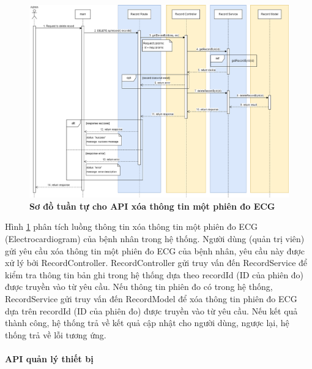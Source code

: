  \begin{figure}[H]
  \centering
  \includegraphics[scale=0.4]{Images/sequence_api/deleteRecordById.png}
  \caption[Sơ đồ tuần tự cho API xóa thông tin một phiên đo ECG ]{\bfseries \fontsize{12pt}{0pt}
  \selectfont Sơ đồ tuần tự cho API xóa thông tin một phiên đo ECG }
  \label{api_deleteRecordById} %
\end{figure}
Hình \ref{api_deleteRecordById} phân tích luồng thông tin xóa thông tin một phiên đo ECG (Electrocardiogram) của bệnh nhân trong hệ thống. Người dùng (quản trị viên) gửi yêu cầu xóa thông tin một phiên đo ECG của bệnh nhân,  
yêu cầu này được xử lý bởi RecordController. RecordController gửi truy vấn đến RecordService để kiểm tra thông tin bản ghi trong hệ thống dựa theo recordId (ID của phiên đo) được truyền vào từ yêu cầu.
Nếu thông tin phiên đo có trong hệ thống, RecordService gửi truy vấn đến RecordModel để xóa thông tin phiên đo ECG dựa trên recordId (ID của phiên đo) được truyền vào từ yêu cầu. Nếu kết quả thành công, hệ thống trả về kết quả cập nhật cho người dùng, ngược lại, hệ thống trả về lỗi tương ứng.


\paragraph{API quản lý thiết bị}
\mbox{}

